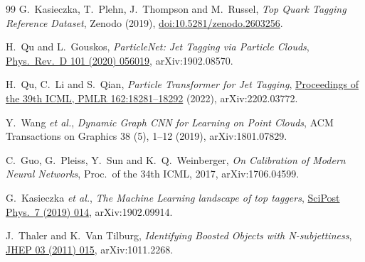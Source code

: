 \documentclass[11pt,a4paper]{article}
\begin{document}
\begin{thebibliography}{99}
G.\ Kasieczka, T.\ Plehn, J.\ Thompson and M.\ Russel,
\emph{Top Quark Tagging Reference Dataset},
Zenodo (2019), \href{https://doi.org/10.5281/zenodo.2603256}
{doi:10.5281/zenodo.2603256}.

H.\ Qu and L.\ Gouskos,
\emph{ParticleNet: Jet Tagging via Particle Clouds},
\href{https://journals.aps.org/prd/abstract/10.1103/PhysRevD.101.056019}{Phys.\ Rev.\ D 101 (2020) 056019},
arXiv:1902.08570.

H.\ Qu, C.\ Li and S.\ Qian,
\emph{Particle Transformer for Jet Tagging},
\href{https://proceedings.mlr.press/v162/qu22b.html}{Proceedings of
the 39th ICML, PMLR 162:18281--18292} (2022),
arXiv:2202.03772.

Y.\ Wang \emph{et al.},
\emph{Dynamic Graph CNN for Learning on Point Clouds},
ACM Transactions on Graphics 38 (5), 1--12 (2019),
arXiv:1801.07829.

C.\ Guo, G.\ Pleiss, Y.\ Sun and K.\ Q.\ Weinberger,
\emph{On Calibration of Modern Neural Networks},
Proc.\ of the 34th ICML, 2017, arXiv:1706.04599.

G.\ Kasieczka \emph{et al.},
\emph{The Machine Learning landscape of top taggers},
\href{https://scipost.org/SciPostPhys.7.1.014}{SciPost Phys.\ 7 (2019) 014},
arXiv:1902.09914.

J.\ Thaler and K.\ Van Tilburg,
\emph{Identifying Boosted Objects with N-subjettiness},
\href{https://link.springer.com/article/10.1007/JHEP03(2011)015}{JHEP 03 (2011) 015},
arXiv:1011.2268.

\end{thebibliography}
\end{document}
